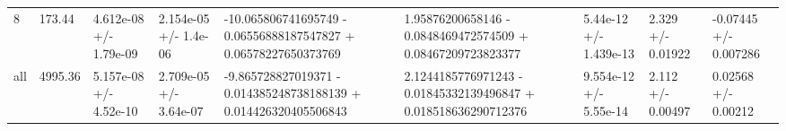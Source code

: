 \begin{tabular}{lllllllll}
8 &  173.44 &  4.612e-08 +/- 1.79e-09 &  2.154e-05 +/-  1.4e-06 &  -10.065806741695749 - 0.06556888187547827 + 0.06578227650373769 &  1.95876200658146 - 0.0848469472574509 + 0.08467209723823377 &    5.44e-12 +/-  1.439e-13 &       2.329 +/-    0.01922 &    -0.07445 +/-   0.007286 \\
all &  4995.36 &  5.157e-08 +/- 4.52e-10 &  2.709e-05 +/- 3.64e-07 &  -9.865728827019371 - 0.014385248738188139 + 0.014426320405506843 &  2.1244185776971243 - 0.01845332139496847 + 0.018518636290712376 &   9.554e-12 +/-   5.55e-14 &       2.112 +/-    0.00497 &     0.02568 +/-    0.00212 \\
\bottomrule
\end{tabular}
